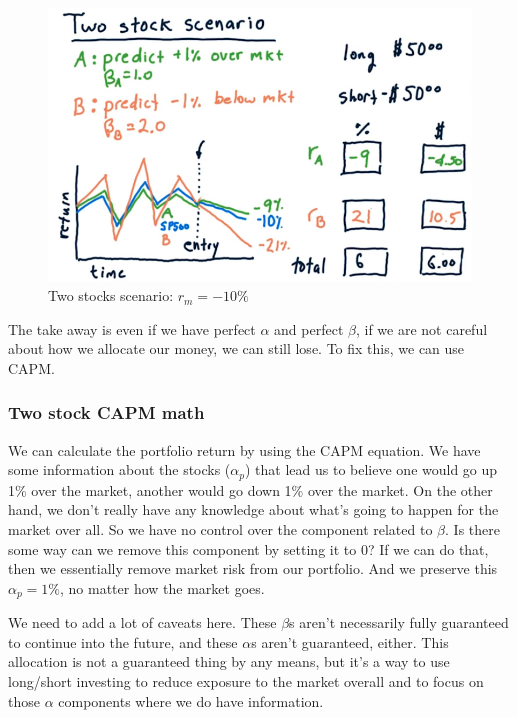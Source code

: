 \documentclass[12pt]{article}
\begin{document}
\begin{figure}[!ht]
\centering
\includegraphics[scale=0.4]{fig/fig43}
\caption{Two stocks scenario: $r_m=-10\%$}
\end{figure}

The take away is even if we have perfect $\alpha$ and perfect $\beta$, if we are not careful about how we allocate our money, we can still lose. To fix this, we can use CAPM. 

\subsubsection{Two stock CAPM math}

We can calculate the portfolio return by using the CAPM equation. We have some information about the stocks ($\alpha_p$) that lead us to believe one would go up 1\% over the market, another would go down 1\% over the market. On the other hand, we don't really have any knowledge about what's going to happen for the market over all. So we have no control over the component related to $\beta$. Is there some way can we remove this component by setting it to 0? If we can do that, then we essentially remove market risk from our portfolio. And we preserve this $\alpha_p=1\%$, no matter how the market goes.

We need to add a lot of caveats here. These $\beta$s aren't necessarily fully guaranteed to continue into the future, and these $\alpha$s aren't guaranteed, either. This allocation is not a guaranteed thing by any means, but it's a way to use long/short investing to reduce exposure to the market overall and to focus on those $\alpha$ components where we do have information.  
\end{document}
